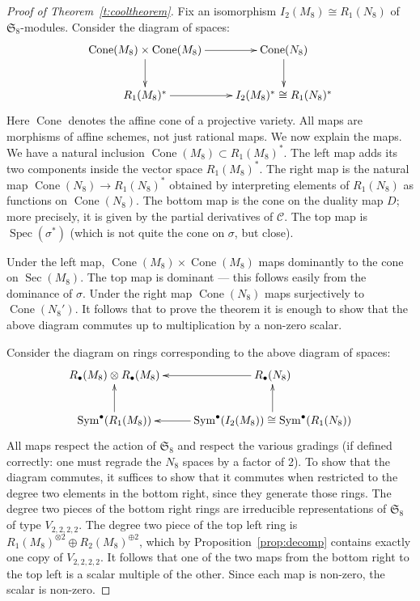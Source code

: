 \documentclass{amsart}
\theoremstyle{definition}
\theoremstyle{remark}
\DeclareMathOperator{\Sym}{Sym}
\DeclareMathOperator{\Spec}{Spec}
\DeclareMathOperator{\Sec}{Sec}
\DeclareMathOperator{\Cone}{Cone}
\def\SS{\mathfrak{S}}
\def\cubic{\mathcal{C}}
\begin{document}
\begin{proof}[Proof of Theorem~\ref{t:cooltheorem}]
Fix an isomorphism $I_2(M_8) \cong R_1(N_8)$ of $\SS_8$-modules.  Consider the diagram of spaces:
\begin{displaymath}
\xymatrix{
\Cone(M_8) \times \Cone(M_8) \ar[r] \ar[d] & \Cone(N_8) \ar[d] \\
R_1(M_8)^* \ar[r] & I_2(M_8)^* \cong R_1(N_8)^* }
\end{displaymath}
Here $\Cone$ denotes the affine cone of a projective variety.  All maps are morphisms of affine schemes, not just
rational maps.  We now explain the maps.  We have a natural inclusion $\Cone(M_8) \subset R_1(M_8)^*$.  The left map
adds its two components inside the vector space $R_1(M_8)^*$.  The right map is the natural map $\Cone(N_8) \to
R_1(N_8)^*$ obtained by interpreting  elements of $R_1(N_8)$ as functions on $\Cone(N_8)$.  The bottom map is the cone on
the duality map $D$; more precisely, it is given by the partial derivatives of $\cubic$.  The top map is
$\Spec(\sigma^*)$ (which is not quite the cone on $\sigma$, but close).

Under the left map, $\Cone(M_8) \times \Cone(M_8)$ maps dominantly to the cone on $\Sec(M_8)$.  The top map
is dominant --- this follows easily from the dominance of $\sigma$.  Under the right map $\Cone(N_8)$ maps
surjectively to $\Cone(N_8')$.  It follows that to prove the theorem it is enough to show that the above diagram
commutes up to multiplication by a non-zero scalar.

Consider the diagram on rings corresponding to the above diagram of spaces:
\begin{displaymath}
\xymatrix{
R_{\bullet}(M_8) \otimes R_{\bullet}(M_8) & R_{\bullet}(N_8) \ar[l] \\
\Sym^{\bullet}(R_1(M_8)) \ar[u] & \Sym^{\bullet}(I_2(M_8)) \cong \Sym^{\bullet}(R_1(N_8)) \ar[l] \ar[u] }
\end{displaymath}
All maps respect the action of $\SS_8$ and respect the various gradings (if defined correctly: one must regrade the
$N_8$ spaces by a factor of 2).
To show that the diagram commutes, it suffices to show that it commutes when restricted to the degree
two elements in the bottom right, since they generate those rings.  The degree two pieces of the bottom right rings
are irreducible representations of $\SS_8$ of type $V_{2,2,2,2}$.  The degree two piece of the top left ring is
$R_1(M_8)^{\otimes 2} \oplus R_2(M_8)^{\oplus 2}$, which by Proposition~\ref{prop:decomp} contains exactly one copy of
$V_{2,2,2,2}$.  It follows that one of the two maps from the bottom right to the top left is a scalar multiple of the
other.  Since each map is non-zero, the scalar is non-zero.
\end{proof}
\end{document}
